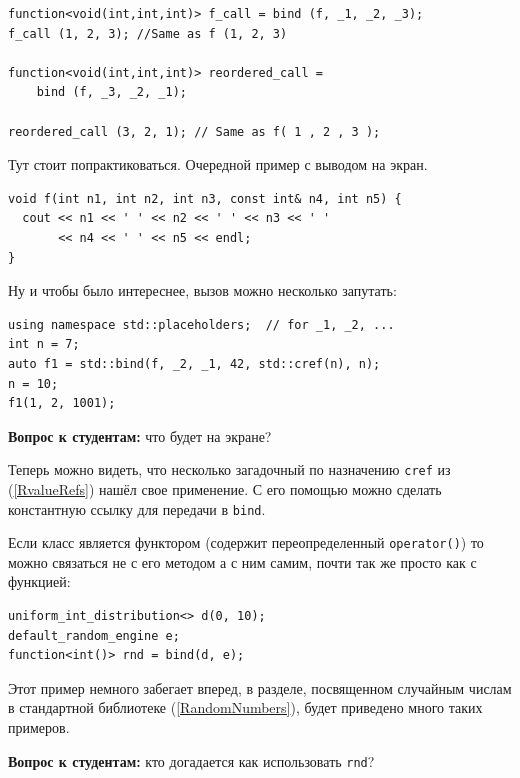 \documentclass[a4paper,12pt,oneside]{article}
\newif\ifanswers
\begin{document}
\begin{lstlisting}
function<void(int,int,int)> f_call = bind (f, _1, _2, _3);
f_call (1, 2, 3); //Same as f (1, 2, 3)

function<void(int,int,int)> reordered_call = 
    bind (f, _3, _2, _1);

reordered_call (3, 2, 1); // Same as f( 1 , 2 , 3 );
\end{lstlisting}

Тут стоит попрактиковаться. Очередной пример с выводом на экран.

\begin{lstlisting}
void f(int n1, int n2, int n3, const int& n4, int n5) {
  cout << n1 << ' ' << n2 << ' ' << n3 << ' ' 
       << n4 << ' ' << n5 << endl;
}
\end{lstlisting}

Ну и чтобы было интереснее, вызов можно несколько запутать:

\begin{lstlisting}
using namespace std::placeholders;  // for _1, _2, ...
int n = 7;
auto f1 = std::bind(f, _2, _1, 42, std::cref(n), n);
n = 10;
f1(1, 2, 1001); 
\end{lstlisting}

\textbf{Вопрос к студентам:} что будет на экране?

\ifanswers
Первый аргумент \lstinline!f1! привязан к \lstinline!n2!, второй к \lstinline!n1!, третий 42, четвертый \lstinline!n! по ссылке, то есть 10, пятый \lstinline!n! по значению то есть 7, а аргумент 1001 не использован вообще.
\fi

Теперь можно видеть, что несколько загадочный по назначению \lstinline!cref! из (\ref{RvalueRefs}) нашёл свое применение. С его помощью можно сделать константную ссылку для передачи в \lstinline!bind!.

Если класс является функтором (содержит переопределенный \lstinline!operator()!) то можно связаться не с его методом а с ним самим, почти так же просто как с функцией:

\begin{lstlisting}
uniform_int_distribution<> d(0, 10);
default_random_engine e;
function<int()> rnd = bind(d, e);
\end{lstlisting}

Этот пример немного забегает вперед, в разделе, посвященном случайным числам в стандартной библиотеке (\ref{RandomNumbers}), будет приведено много таких примеров.

\textbf{Вопрос к студентам:} кто догадается как использовать \lstinline!rnd!?
\end{document}
